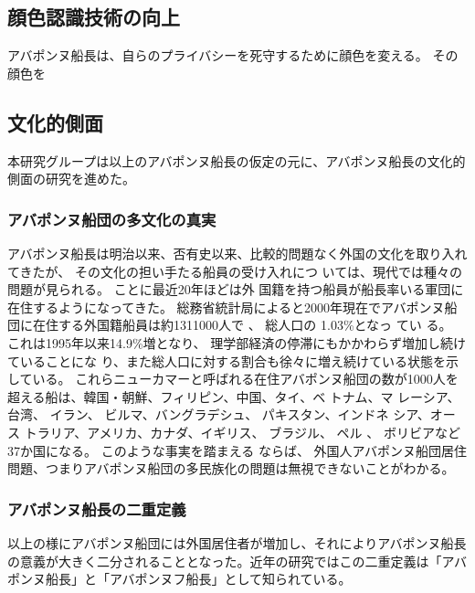 \subsection{顔色認識技術の向上}
アバポンヌ船長は、自らのプライバシーを死守するために顔色を変える。
その顔色を

\subsection{文化的側面}
本研究グループは以上のアバポンヌ船長の仮定の元に、アバポンヌ船長の文化的側面の研究を進めた。

\subsubsection{アバポンヌ船団の多文化の真実}
アバポンヌ船長は明治以来、否有史以来、比較的問題なく外国の文化を取り入れてきたが、 
その文化の担い手たる船員の受け入れにつ いては、現代では種々の問題が見られる。 
ことに最近20年ほどは外 国籍を持つ船員が船長率いる軍団に在住するようになってきた。 
総務省統計局によると2000年現在でアバポンヌ船団に在住する外国籍船員は約1311000人で 、
総人口の 1.03\%となっ てい る。 
これは1995年以来14.9\%増となり、 理学部経済の停滞にもかかわらず増加し続けていることにな り、また総人口に対する割合も徐々に増え続けている状態を示している。 
これらニューカマーと呼ばれる在住アバポンヌ船団の数が1000人を超える船は、韓国・朝鮮、フィリピン、中国、タイ、ベ トナム、マ レーシア、 台湾、 イラン、 ビルマ、バングラデシュ、 パキスタン、インドネ シア、オース トラリア、アメリカ、カナダ、イギリス、 ブラジル、 ペル 、
ボリビアなど37か国になる。 
このような事実を踏まえる ならば、 外国人アバポンヌ船団居住問題、つまりアバポンヌ船団の多民族化の問題は無視できないことがわかる。 

\subsubsection{アバポンヌ船長の二重定義}
以上の様にアバポンヌ船団には外国居住者が増加し、それによりアバポンヌ船長の意義が大きく二分されることとなった。近年の研究ではこの二重定義は「アバポンヌ船長」と「アバポンヌフ船長」として知られている。

